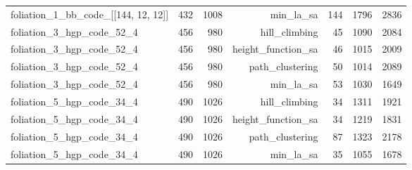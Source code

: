 \begin{longtable}{lrrrrrr}
  foliation\_1\_bb\_code\_[[144, 12, 12]] & 432 & 1008 & min\_la\_sa & 144 & 1796 & 2836 \\
  foliation\_3\_hgp\_code\_52\_4 & 456 & 980 & hill\_climbing & 45 & 1090 & 2084 \\
  foliation\_3\_hgp\_code\_52\_4 & 456 & 980 & height\_function\_sa & 46 & 1015 & 2009 \\
  foliation\_3\_hgp\_code\_52\_4 & 456 & 980 & path\_clustering & 50 & 1014 & 2089 \\
  foliation\_3\_hgp\_code\_52\_4 & 456 & 980 & min\_la\_sa & 53 & 1030 & 1649 \\
  foliation\_5\_hgp\_code\_34\_4 & 490 & 1026 & hill\_climbing & 34 & 1311 & 1921 \\
  foliation\_5\_hgp\_code\_34\_4 & 490 & 1026 & height\_function\_sa & 34 & 1219 & 1831 \\
  foliation\_5\_hgp\_code\_34\_4 & 490 & 1026 & path\_clustering & 87 & 1323 & 2178 \\
  foliation\_5\_hgp\_code\_34\_4 & 490 & 1026 & min\_la\_sa & 35 & 1055 & 1678 \\
\end{longtable}
